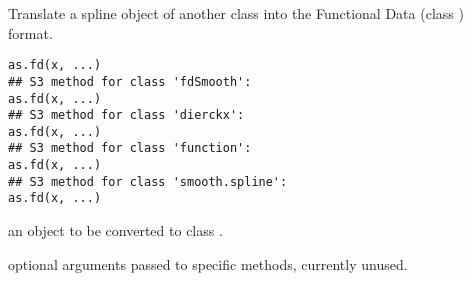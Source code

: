 \begin{Description}\relax
Translate a spline object of another class into the Functional Data
(class ) format.
\end{Description}
\begin{Usage}
\begin{verbatim}
as.fd(x, ...)
## S3 method for class 'fdSmooth':
as.fd(x, ...)
## S3 method for class 'dierckx':
as.fd(x, ...) 
## S3 method for class 'function':
as.fd(x, ...)
## S3 method for class 'smooth.spline':
as.fd(x, ...) 
\end{verbatim}
\end{Usage}
\begin{Arguments}
\begin{ldescription}
\item[\code{x}] an object to be converted to class .  

\item[\code{...}] optional arguments passed to specific methods, currently unused.  

\end{ldescription}
\end{Arguments}
